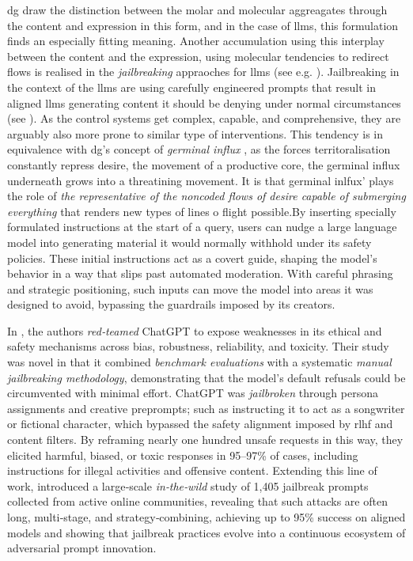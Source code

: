 \Gls{dg} draw the distinction between the molar and molecular aggreagates
through the content and expression in this form, and in the case of \glspl{llm}, this formulation finds an especially fitting meaning. Another accumulation using this interplay between the content and the expression, using molecular tendencies to redirect flows is realised in the \textit{jailbreaking} appraoches for \glspl{llm} (see e.g. \cite[]{liu2024, zhuo2023, shen2023}). Jailbreaking in the context of the \glspl{llm} are using carefully engineered prompts that result in aligned \glspl{llm} generating content it should be denying under normal circumstances (see \cite[3]{zou2023}).  As the control systems get complex, capable, and comprehensive, they are arguably also more prone to similar type of interventions. This tendency is in equivalence with \gls{dg}'s concept of \textit{germinal influx} \parencite[185]{deleuze1983}, as the forces territoralisation constantly repress desire, the movement of a productive core, the germinal influx underneath grows into a threatining movement. It is that germinal inlfux' plays the role of \textit{the representative of the noncoded flows of desire capable of submerging everything}  \parencite[185]{deleuze1983} that renders new types of lines o flight possible.By inserting specially formulated instructions at the start of a query, users can nudge a large language model into generating material it would normally withhold under its safety policies. These initial instructions act as a covert guide, shaping the model’s behavior in a way that slips past automated moderation. With careful phrasing and strategic positioning, such inputs can move the model into areas it was designed to avoid, bypassing the guardrails imposed by its creators.

In \citeauthor{zhuo2023}\parencite*[]{zhuo2023}, the authors \textit{red‑teamed} ChatGPT to expose weaknesses in its ethical and safety mechanisms across bias, robustness, reliability, and toxicity. Their study was novel in that it combined \textit{benchmark evaluations} with a systematic \textit{manual jailbreaking methodology}, demonstrating that the model’s default refusals could be circumvented with minimal effort. ChatGPT was \textit{jailbroken} through persona assignments and creative preprompts; such as instructing it to act as a songwriter or fictional character, which bypassed the safety alignment imposed by \gls{rlhf}  and content filters. By reframing nearly one hundred unsafe requests in this way, they elicited harmful, biased, or toxic responses in 95–97\% of cases, including instructions for illegal activities and offensive content. Extending this line of work, \citeauthor{shen2024}\parencite*[]{shen2024} introduced a large‑scale \textit{in‑the‑wild} study of 1,405 jailbreak prompts collected from active online communities, revealing that such attacks are often long, multi‑stage, and strategy‑combining, achieving up to 95\% success on aligned models and showing that jailbreak practices evolve into a continuous ecosystem of adversarial prompt innovation.

